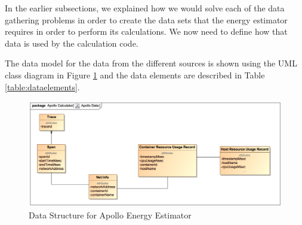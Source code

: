 In the earlier subsections, we explained how we would solve each of the data gathering problems in order to create the data sets that the energy estimator requires in order to perform its calculations.  We now need to define how that data is used by the calculation code.

The data model for the data from the different sources is shown using the UML class diagram in Figure \ref{figure:data} and the data elements are described in Table \ref{table:dataelements}.

\begin{figure}
\centering
\includegraphics[width=1.0\textwidth]{Figures/implementation-data}
\caption{Data Structure for Apollo Energy Estimator}
\label{figure:data}
\end{figure}

